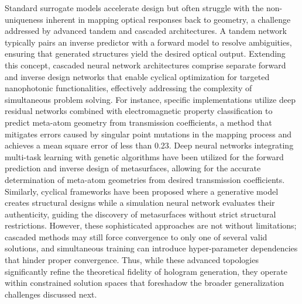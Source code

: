 Standard surrogate models accelerate design but often struggle with the non-uniqueness inherent in mapping optical responses back to geometry, a challenge addressed by advanced tandem and cascaded architectures. A tandem network typically pairs an inverse predictor with a forward model to resolve ambiguities, ensuring that generated structures yield the desired optical output. Extending this concept, cascaded neural network architectures comprise separate forward and inverse design networks that enable cyclical optimization for targeted nanophotonic functionalities, effectively addressing the complexity of simultaneous problem solving. For instance, specific implementations utilize deep residual networks combined with electromagnetic property classification to predict meta-atom geometry from transmission coefficients, a method that mitigates errors caused by singular point mutations in the mapping process and achieves a mean square error of less than 0.23. Deep neural networks integrating multi-task learning with genetic algorithms have been utilized for the forward prediction and inverse design of metasurfaces, allowing for the accurate determination of meta-atom geometries from desired transmission coefficients. \citep{doi_10_1016_j_rio_2026_100988_b00ee173} Similarly, cyclical frameworks have been proposed where a generative model creates structural designs while a simulation neural network evaluates their authenticity, guiding the discovery of metasurfaces without strict structural restrictions. However, these sophisticated approaches are not without limitations; cascaded methods may still force convergence to only one of several valid solutions, and simultaneous training can introduce hyper-parameter dependencies that hinder proper convergence. Thus, while these advanced topologies significantly refine the theoretical fidelity of hologram generation, they operate within constrained solution spaces that foreshadow the broader generalization challenges discussed next. \citep{doi_10_1038_s41598_020_76400_y_aa62c15d} \citep{doi_10_1109_iccem60619_2024_10559188_c3199408}

